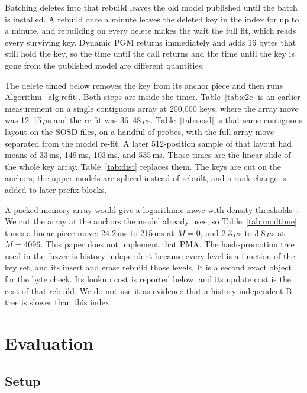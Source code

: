 \documentclass[conference]{IEEEtran}
\begin{document}
Batching deletes into that rebuild leaves the old model published until the batch is installed.
A rebuild once a minute leaves the deleted key in the index for up to a minute, and rebuilding on every delete makes the wait the full fit, which reads every surviving key.
Dynamic PGM returns immediately and adds 16 bytes that still hold the key, so the time until the call returns and the time until the key is gone from the published model are different quantities.

The delete timed below removes the key from its anchor piece and then runs Algorithm~\ref{alg:refit}.
Both steps are inside the timer.
Table~\ref{tab:e2e} is an earlier measurement on a single contiguous array at 200{,}000 keys, where the array move was 12--15\,$\mu$s and the re-fit was 36--48\,$\mu$s.
Table~\ref{tab:sosd} is that same contiguous layout on the SOSD files, on a handful of probes, with the full-array move separated from the model re-fit.
A later 512-position sample of that layout had means of 33\,ms, 149\,ms, 103\,ms, and 535\,ms.
Those times are the linear slide of the whole key array.
Table~\ref{tab:dist} replaces them.
The keys are cut on the anchors, the upper models are spliced instead of rebuilt, and a rank change is added to later prefix blocks.

A packed-memory array would give a logarithmic move with density thresholds~\cite{bender2016}.
We cut the array at the anchors the model already uses, so Table~\ref{tab:modtime} times a linear piece move: 24.2\,ms to 215\,ms at $M=0$, and 2.3\,$\mu$s to 3.8\,$\mu$s at $M=4096$.
This paper does not implement that PMA.
The hash-promotion tree used in the fuzzer is history independent because every level is a function of the key set, and its insert and erase rebuild those levels.
It is a second exact object for the byte check.
Its lookup cost is reported below, and its update cost is the cost of that rebuild.
We do not use it as evidence that a history-independent B-tree is slower than this index.

\section{Evaluation}
\label{sec:eval}

\subsection{Setup}
\end{document}
